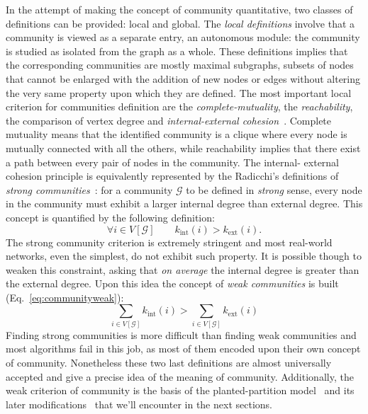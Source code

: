 In the attempt of making the concept of community quantitative, two classes of definitions can be provided: local and global.
The \emph{local definitions} involve that a community is viewed as a separate entry, an autonomous module: the community is studied as isolated from the graph as a whole.
These definitions implies that the corresponding communities are mostly maximal subgraphs, subsets of nodes that cannot be enlarged with the addition of new nodes or edges without altering the very same property upon which they are defined.
The most important local criterion for communities definition are the \emph{complete-mutuality}, the \emph{reachability}, the comparison of vertex degree and \emph{internal-external cohesion}~\cite{wasserman1994,alba1973}.
Complete mutuality means that the identified community is a clique where every node is mutually connected with all the others, while reachability implies that there exist a path between every pair of nodes in the community.
The internal- external cohesion principle is equivalently represented by the Radicchi's definitions of \emph{strong communities}~\cite{radicchi2004}: for a community $\mathcal{G}$ to be defined in \emph{strong} sense, every node in the community must exhibit a larger internal degree than external degree. This concept is quantified by the following definition:
\begin{equation}\label{eq:strongcommunities}
\forall i \in V[ \mathcal{G} ] \qquad k_{\textrm{int}}(i) > k_{\textrm{ext}}(i).
\end{equation}
The strong community criterion is extremely stringent and most real-world networks, even the simplest, do not exhibit such property.
It is possible though to weaken this constraint, asking that \emph{on average} the internal degree is greater than the external degree.
Upon this idea the concept of \emph{weak communities} is built (Eq.~\ref{eq:communityweak}):
\begin{equation}\label{eq:communityweak}
\sum \limits_{i \in V[\mathcal{G}]} k_{\textrm{int}}(i) > \sum \limits_{i \in V[\mathcal{G}]} k_{\textrm{ext}}(i)
\end{equation}
Finding strong communities is more difficult than finding weak communities and most algorithms fail in this job, as most of them encoded upon their own concept of community.
Nonetheless these two last definitions are almost universally accepted and give a precise idea of the meaning of community.
Additionally, the weak criterion of community is the basis of the planted-partition model~\cite{condon2000} and its later modifications~\cite{lancichinetti2008} that we'll encounter in the next sections.

